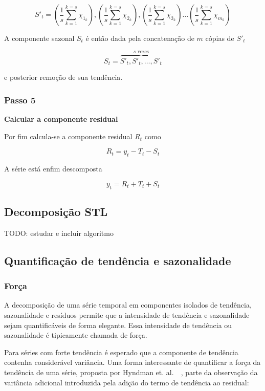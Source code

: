 $$ S'_t = \left(\frac{1}{s} \sum_{k=1}^{k=s} \chi_{1_{k}}\right), \left(\frac{1}{s} \sum_{k=1}^{k=s} \chi_{2_{k}}\right), \left(\frac{1}{s} \sum_{k=1}^{k=s} \chi_{3_{k}}\right) \hdots \left(\frac{1}{s} \sum_{k=1}^{k=s} \chi_{m_{k}}\right)$$

A componente sazonal $S_t$ é então dada pela concatenação de $m$ cópias de
$S'_t$

$$ S_t = \overbrace{S'_t, S'_t, \hdots, S'_t}^{s\text{ vezes}} $$

e posterior remoção de sua tendência.

\subsubsection{Passo 5}

\textbf{Calcular a componente residual}

Por fim calcula-se a componente residual $R_t$ como

$$ R_t = y_t - T_t - S_t $$

A série está enfim descomposta

$$ y_t = R_t + T_t + S_t $$

\subsection{Decomposição STL}

TODO: estudar e incluir algoritmo

\subsection{Quantificação de tendência e sazonalidade}

\subsubsection{Força}

A decomposição de uma série temporal em componentes isolados de tendência,
sazonalidade e resíduos permite que a intensidade de tendência e sazonalidade
sejam quantificáveis de forma elegante. Essa intensidade de tendência ou
sazonalidade é tipicamente chamada de força.

Para séries com forte tendência é esperado que a componente de tendência
contenha considerável variância. Uma forma interessante de quantificar a força
da tendência de uma série, proposta por Hyndman et. al.~~\cite{hyndman}, parte
da observação da variância adicional introduzida pela adição do termo de
tendência ao residual:

